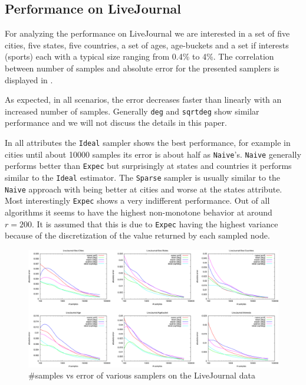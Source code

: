 \subsection{Performance on LiveJournal}
For analyzing the performance on LiveJournal we are interested in a set of five cities, five states, five countries, a set of ages, age-buckets and a set if interests (sports) each with a typical size ranging from 0.4\% to 4\%.
The correlation between number of samples and absolute error for the presented samplers is displayed in .

As expected, in all scenarios, the error decreases faster than linearly with an increased number of samples.
Generally \texttt{deg} and \texttt{sqrtdeg} show similar performance and we will not discuss the details in this paper.

In all attributes the \texttt{Ideal} sampler shows the best performance, for example in cities until about 10000 samples its error is about half as \texttt{Naive}'s.
\texttt{Naive} generally performs better than \texttt{Expec} but surprisingly at states and countries it performs similar to the \texttt{Ideal} estimator.
The \texttt{Sparse} sampler is usually similar to the \texttt{Naive} approach with being better at cities and worse at the states attribute.
Most interestingly \texttt{Expec} shows a very indifferent performance. Out of all algorithms it seems to have the highest non-monotone behavior at around $r=200$. It is assumed that this is due to \texttt{Expec} having the highest variance because of the discretization of the value returned by each sampled node.
\begin{figure}[!ht]
  \begin{center}
    \includegraphics[width=\linewidth]{fig2_3}
    \caption{\#samples vs error of various samplers on the LiveJournal data}
  \end{center}
\end{figure}
